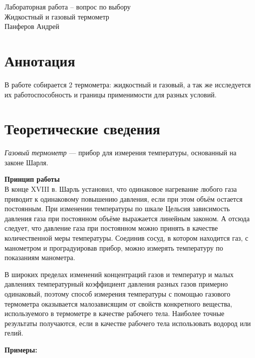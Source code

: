 




\begin{center}
  \LARGE{Лабораторная работа -- вопрос по выбору}\\[0.2cm]
  \LARGE{Жидкостный и газовый термометр}\\[0.2cm]
  \large{Панферов Андрей}\\[0.2cm]
\end{center}  
  
\section{Аннотация}
В работе собирается 2 термометра: жидкостный и газовый, а так же исследуется их работоспособность и границы применимости для разных условий. 

\section{Теоретические сведения}
\textit{Газовый термометр} — прибор для измерения температуры, основанный на законе Шарля.



\textbf{Принцип работы}\\

В конце XVIII в. Шарль установил, что одинаковое нагревание любого газа приводит к одинаковому повышению давления, если при этом объём остается постоянным. При изменении температуры по шкале Цельсия зависимость давления газа при постоянном объёме выражается линейным законом. А отсюда следует, что давление газа при постоянном можно принять в качестве количественной меры температуры. Соединив сосуд, в котором находится газ, с манометром и проградуировав прибор, можно измерять температуру по показаниям манометра.

В широких пределах изменений концентраций газов и температур и малых давлениях температурный коэффициент давления разных газов примерно одинаковый, поэтому способ измерения температуры с помощью газового термометра оказывается малозависящим от свойств конкретного вещества, используемого в термометре в качестве рабочего тела. Наиболее точные результаты получаются, если в качестве рабочего тела использовать водород или гелий.

\textbf{Примеры:}\\

